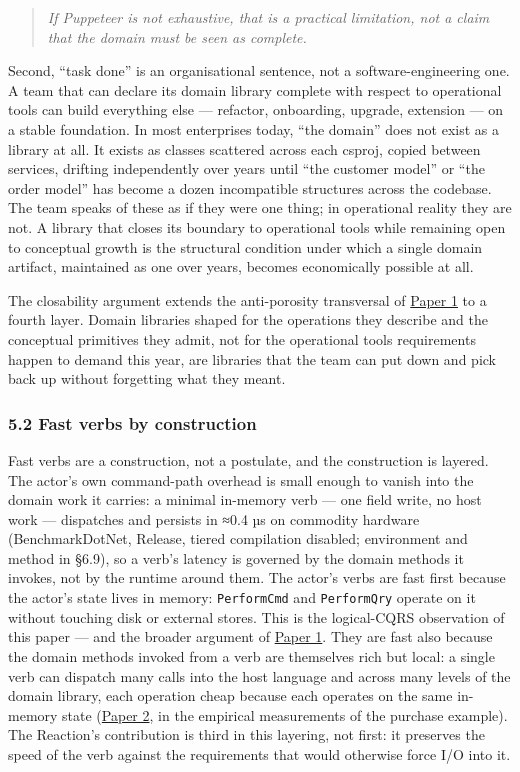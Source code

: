 \documentclass[
]{article}
\let\origtexttt\texttt%
\renewcommand{\texttt}[1]{\origtexttt{\seqsplit{#1}}}%
\let\texttt\origtexttt%
\begin{document}
\begin{quote}
\emph{If Puppeteer is not exhaustive, that is a practical limitation,
not a claim that the domain must be seen as complete.}
\end{quote}

Second, ``task done'' is an organisational sentence, not a
software-engineering one. A team that can declare its domain library
complete with respect to operational tools can build everything else ---
refactor, onboarding, upgrade, extension --- on a stable foundation. In
most enterprises today, ``the domain'' does not exist as a library at
all. It exists as classes scattered across each csproj, copied between
services, drifting independently over years until ``the customer model''
or ``the order model'' has become a dozen incompatible structures across
the codebase. The team speaks of these as if they were one thing; in
operational reality they are not. A library that closes its boundary to
operational tools while remaining open to conceptual growth is the
structural condition under which a single domain artifact, maintained as
one over years, becomes economically possible at all.

The closability argument extends the anti-porosity transversal of
\href{01-anti-porosity.md}{Paper 1} to a fourth layer. Domain libraries
shaped for the operations they describe and the conceptual primitives
they admit, not for the operational tools requirements happen to demand
this year, are libraries that the team can put down and pick back up
without forgetting what they meant.

\subsubsection{5.2 Fast verbs by
construction}\label{fast-verbs-by-construction}

Fast verbs are a construction, not a postulate, and the construction is
layered. The actor's own command-path overhead is small enough to vanish
into the domain work it carries: a minimal in-memory verb --- one field
write, no host work --- dispatches and persists in ≈0.4 µs on commodity
hardware (BenchmarkDotNet, Release, tiered compilation disabled;
environment and method in §6.9), so a verb's latency is governed by the
domain methods it invokes, not by the runtime around them. The actor's
verbs are fast first because the actor's state lives in memory:
\texttt{PerformCmd} and \texttt{PerformQry} operate on it without
touching disk or external stores. This is the logical-CQRS observation
of this paper --- and the broader argument of
\href{01-anti-porosity.md}{Paper 1}. They are fast also because the
domain methods invoked from a verb are themselves rich but local: a
single verb can dispatch many calls into the host language and across
many levels of the domain library, each operation cheap because each
operates on the same in-memory state
(\href{02-program-value-separability.md}{Paper 2}, in the empirical
measurements of the purchase example). The Reaction's contribution is
third in this layering, not first: it preserves the speed of the verb
against the requirements that would otherwise force I/O into it.
\end{document}
